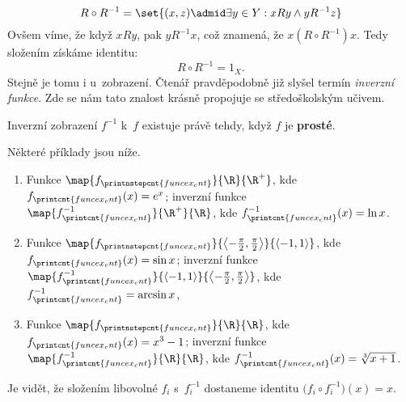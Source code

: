 \begin{equation*}
    R\circ R^{-1}=\set{(x,z) \admid \exists y\in Y: xRy \land yR^{-1}z}
\end{equation*}
Ovšem víme, že když $xRy$, pak $yR^{-1}x$, což znamená, že $x(R\circ R^{-1})x$. Tedy složením získáme identitu:
\begin{equation*}
    R\circ R^{-1}=1_X.
\end{equation*}
Stejně je tomu i u~zobrazení. Čtenář pravděpodobně již slyšel termín \emph{inverzní funkce}. Zde se nám tato znalost krásně propojuje se středoškolským učivem.
\begin{remark}\label{rem:existence_inv_zobrazeni}
    Inverzní zobrazení $f^{-1}$ k~$f$ existuje právě tehdy, když $f$ je \textbf{prosté}.
\end{remark}
Některé příklady jsou níže.
\begin{enumerate}[label=(\roman*)]
\item Funkce $\map{f_{\printnstepcnt{funcex_cnt}}}{\R}{\R^+}$, kde $f_{\printcnt{funcex_cnt}}(x)=e^x$; inverzní funkce $\map{f_{\printcnt{funcex_cnt}}^{-1}}{\R^+}{\R}$, kde $f_{\printcnt{funcex_cnt}}^{-1}(x)=\ln{x}$.
\item \sloppy Funkce $\map{f_{\printnstepcnt{funcex_cnt}}}{\left\langle-\frac{\pi}{2},\frac{\pi}{2}\right\rangle}{\langle-1,1\rangle}$, kde $f_{\printcnt{funcex_cnt}}(x)=\sin{x}$; inverzní funkce ${\map{f_{\printcnt{funcex_cnt}}^{-1}}{\langle-1,1\rangle}{\left\langle-\frac{\pi}{2},\frac{\pi}{2}\right\rangle}}$, kde $f_{\printcnt{funcex_cnt}}^{-1}=\arcsin{x}$,
\item Funkce $\map{f_{\printnstepcnt{funcex_cnt}}}{\R}{\R}$, kde $f_{\printcnt{funcex_cnt}}(x)=x^3-1$; inverzní funkce $\map{f_{\printcnt{funcex_cnt}}^{-1}}{\R}{\R}$, kde $f_{\printcnt{funcex_cnt}}^{-1}(x)=\sqrt[3]{x+1}$.
\end{enumerate}
Je vidět, že složením libovolné $f_i$ s~$f_i^{-1}$ dostaneme identitu $\bigl(f_i\circ f_i^{-1}\bigr)(x)=x$.

